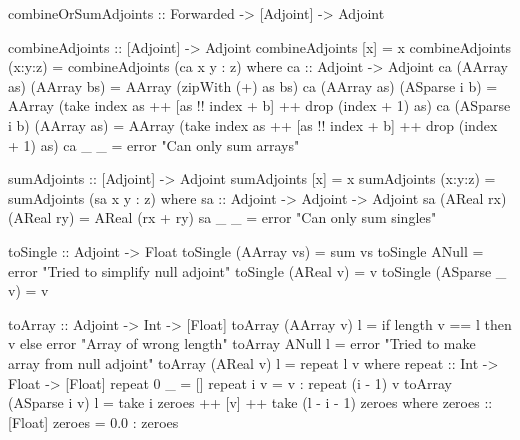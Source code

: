         \begin{haskell}[caption=Functions to transform and combine adjoints, label=lst:combine, gobble=12]
            combineOrSumAdjoints :: Forwarded -> [Adjoint] -> Adjoint

            combineAdjoints :: [Adjoint] -> Adjoint
            combineAdjoints [x]     = x
            combineAdjoints (x:y:z) = combineAdjoints (ca x y : z)
                where
                    ca :: Adjoint -> Adjoint
                    ca (AArray as) (AArray bs)   = AArray (zipWith (+) as bs)
                    ca (AArray as) (ASparse i b) = AArray
                        (take index as ++ [as !! index + b] ++ drop (index + 1) as)
                    ca (ASparse i b) (AArray as) = AArray
                        (take index as ++ [as !! index + b] ++ drop (index + 1) as)
                    ca _           _             = error "Can only sum arrays"
            
            sumAdjoints :: [Adjoint] -> Adjoint
            sumAdjoints [x]     = x
            sumAdjoints (x:y:z) = sumAdjoints (sa x y : z)
                where
                    sa :: Adjoint -> Adjoint -> Adjoint
                    sa (AReal rx) (AReal ry) = AReal (rx + ry)
                    sa _          _          = error "Can only sum singles"
    
            toSingle :: Adjoint -> Float
            toSingle (AArray vs)   = sum vs
            toSingle ANull         = error "Tried to simplify null adjoint"
            toSingle (AReal v)     = v
            toSingle (ASparse _ v) = v
    
            toArray :: Adjoint -> Int -> [Float]
            toArray (AArray v) l =
                if   length v == l
                then v
                else error "Array of wrong length"
            toArray ANull        l = error "Tried to make array from null adjoint"
            toArray (AReal v)    l = repeat l v
                where
                    repeat :: Int -> Float -> [Float]
                    repeat 0 _ = []
                    repeat i v = v : repeat (i - 1) v
            toArray (ASparse i v) l = take i zeroes ++ [v] ++ take (l - i - 1) zeroes
                where
                    zeroes :: [Float]
                    zeroes = 0.0 : zeroes
        \end{haskell}